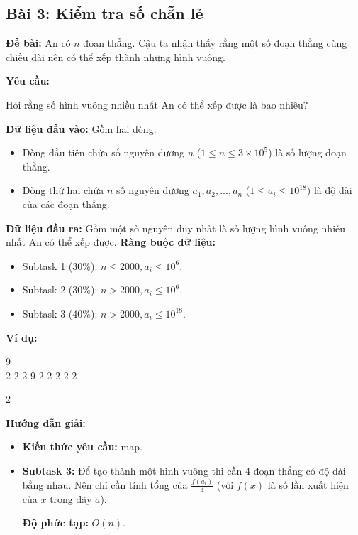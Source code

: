 \documentclass[12pt]{scrartcl}  %
\begin{document}
\subsection{Bài 3: Kiểm tra số chẵn lẻ}
\textbf{Đề bài:}
An có $n$ đoạn thẳng. Cậu ta nhận thấy rằng một số đoạn thẳng cùng chiều dài nên có thể xếp thành những hình vuông.

\textbf{Yêu cầu:}

Hỏi rằng số hình vuông nhiều nhất An có thể xếp được là bao nhiêu?

\textbf{Dữ liệu đầu vào:}
Gồm hai dòng:
\begin{itemize}
    \item Dòng đầu tiên chứa số nguyên dương $n$ ($1 \leq n \leq 3 \times 10^5$) là số lượng đoạn thẳng.
    \item Dòng thứ hai chứa $n$ số nguyên dương $a_1, a_2, ..., a_n$ ($1 \leq a_i \leq 10^{18}$) là độ dài của các đoạn thẳng.
\end{itemize}
\textbf{Dữ liệu đầu ra:}
Gồm một số nguyên duy nhất là số lượng hình vuông nhiều nhất An có thể xếp được.
\textbf{Ràng buộc dữ liệu:}

\begin{itemize}
    \item Subtask 1 (30\%): $n \leq 2000, a_i \leq 10^6$.
    \item Subtask 2 (30\%): $n > 2000, a_i \leq 10^6$.
    \item Subtask 3 (40\%): $n > 2000, a_i \leq 10^{18}$.
\end{itemize}


\textbf{Ví dụ:}
\begin{tcolorbox}[colback=gray!5!white, colframe=blue!50!black, title=Input]
9\\
2 2 2 9 2 2 2 2 2
\end{tcolorbox}
\begin{tcolorbox}[colback=gray!5!white, colframe=green!50!black, title=Output]
2
\end{tcolorbox}

\textbf{Hướng dẫn giải:}
\begin{itemize}
    \item \textbf{Kiến thức yêu cầu:} map.
    \item \textbf{Subtask 3:} Để tạo thành một hình vuông thì cần $4$ đoạn thẳng
    có độ dài bằng nhau. Nên chỉ cần tính tổng của $\frac{f(a_i)}{4}$ (với $f(x)$ là số lần xuất
    hiện của $x$ trong dãy $a$).

    \textbf{Độ phức tạp:} $O(n)$.
\end{itemize}
\end{document}
